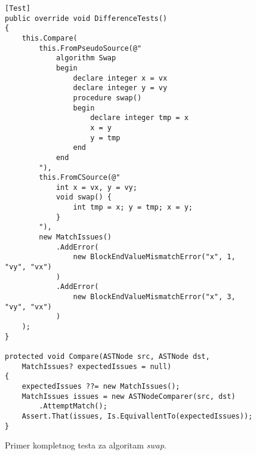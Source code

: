 \begin{figure}[h!]
\centering
\begin{lstlisting}
[Test]
public override void DifferenceTests()
{
    this.Compare(
        this.FromPseudoSource(@"
            algorithm Swap 
            begin
                declare integer x = vx
                declare integer y = vy
                procedure swap()
                begin
                    declare integer tmp = x
                    x = y  
                    y = tmp
                end
            end
        "),
        this.FromCSource(@"
            int x = vx, y = vy;
            void swap() {
                int tmp = x; y = tmp; x = y;
            }
        "),
        new MatchIssues()
            .AddError(
                new BlockEndValueMismatchError("x", 1, "vy", "vx")
            )
            .AddError(
                new BlockEndValueMismatchError("x", 3, "vy", "vx")
            )
    );
}

protected void Compare(ASTNode src, ASTNode dst, 
    MatchIssues? expectedIssues = null)
{
    expectedIssues ??= new MatchIssues();
    MatchIssues issues = new ASTNodeComparer(src, dst)
        .AttemptMatch();
    Assert.That(issues, Is.EquivallentTo(expectedIssues));
}
\end{lstlisting}
\caption{Primer kompletnog testa za algoritam \emph{swap}.}
\label{fig:ImplTestsIntegration}
\end{figure}
